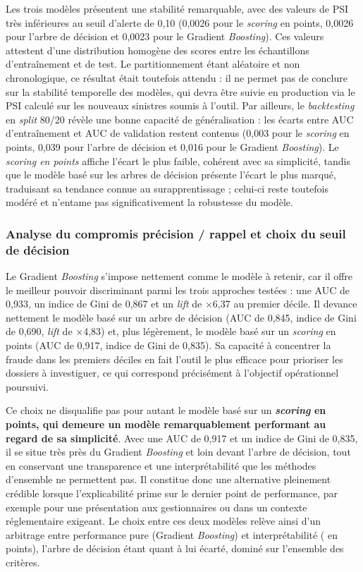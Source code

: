 Les trois modèles présentent une stabilité remarquable, avec des valeurs de PSI très inférieures au seuil d'alerte de 0,10 (0,0026 pour le \textit{scoring} en points, 0,0026 pour l'arbre de décision et 0,0023 pour le Gradient \textit{Boosting}). Ces valeurs attestent d'une distribution homogène des scores entre les échantillons d'entraînement et de test. Le partitionnement étant aléatoire et non chronologique, ce résultat était toutefois attendu : il ne permet pas de conclure sur la stabilité temporelle des modèles, qui devra être suivie en production via le PSI calculé sur les nouveaux sinistres soumis à l'outil. Par ailleurs, le \textit{backtesting} en \textit{split} 80/20 révèle une bonne capacité de généralisation : les écarts entre AUC d'entraînement et AUC de validation restent contenus (0,003 pour le \textit{scoring} en points, 0,039 pour l'arbre de décision et 0,016 pour le Gradient \textit{Boosting}). Le \textit{scoring en points} affiche l'écart le plus faible, cohérent avec sa simplicité, tandis que le modèle basé sur les arbres de décision présente l'écart le plus marqué, traduisant sa tendance connue au surapprentissage ; celui-ci reste toutefois modéré et n'entame pas significativement la robustesse du modèle.

\subsubsection*{Analyse du compromis précision / rappel et choix du seuil de décision}

Le Gradient \textit{Boosting} s'impose nettement comme le modèle à retenir, car il offre le meilleur pouvoir discriminant parmi les trois approches testées : une AUC de 0,933, un indice de Gini de 0,867 et un \textit{lift} de $\times$6,37 au premier décile. Il devance nettement le modèle basé sur un arbre de décision (AUC de 0,845, indice de Gini de 0,690, \textit{lift} de $\times$4,83) et, plus légèrement, le modèle basé sur un \textit{scoring} en points (AUC de 0,917, indice de Gini de 0,835). Sa capacité à concentrer la fraude dans les premiers déciles en fait l'outil le plus efficace pour prioriser les dossiers à investiguer, ce qui correspond précisément à l'objectif opérationnel poursuivi.

Ce choix ne disqualifie pas pour autant le modèle basé sur un \textbf{\textit{scoring} en points, qui demeure un modèle remarquablement performant au regard de sa simplicité}. Avec une AUC de 0,917 et un indice de Gini de 0,835, il se situe très près du Gradient \textit{Boosting} et loin devant l'arbre de décision, tout en conservant une transparence et une interprétabilité que les méthodes d'ensemble ne permettent pas. Il constitue donc une alternative pleinement crédible lorsque l'explicabilité prime sur le dernier point de performance, par exemple pour une présentation aux gestionnaires ou dans un contexte réglementaire exigeant. Le choix entre ces deux modèles relève ainsi d'un arbitrage entre performance pure (Gradient \textit{Boosting}) et interprétabilité ( en points), l'arbre de décision étant quant à lui écarté, dominé sur l'ensemble des critères.

